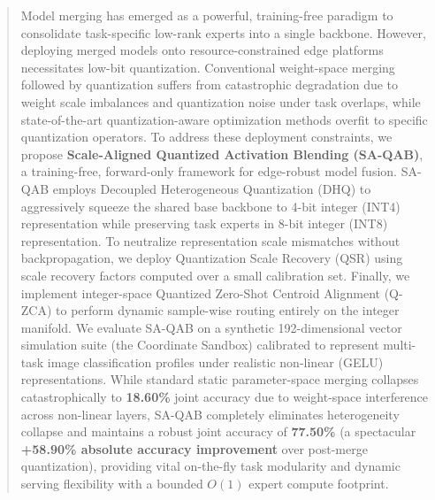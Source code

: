\begin{abstract}
Model merging has emerged as a powerful, training-free paradigm to consolidate task-specific low-rank experts into a single backbone. However, deploying merged models onto resource-constrained edge platforms necessitates low-bit quantization. Conventional weight-space merging followed by quantization suffers from catastrophic degradation due to weight scale imbalances and quantization noise under task overlaps, while state-of-the-art quantization-aware optimization methods overfit to specific quantization operators. To address these deployment constraints, we propose \textbf{Scale-Aligned Quantized Activation Blending (SA-QAB)}, a training-free, forward-only framework for edge-robust model fusion. SA-QAB employs Decoupled Heterogeneous Quantization (DHQ) to aggressively squeeze the shared base backbone to 4-bit integer (INT4) representation while preserving task experts in 8-bit integer (INT8) representation. To neutralize representation scale mismatches without backpropagation, we deploy Quantization Scale Recovery (QSR) using scale recovery factors computed over a small calibration set. Finally, we implement integer-space Quantized Zero-Shot Centroid Alignment (Q-ZCA) to perform dynamic sample-wise routing entirely on the integer manifold. We evaluate SA-QAB on a synthetic 192-dimensional vector simulation suite (the Coordinate Sandbox) calibrated to represent multi-task image classification profiles under realistic non-linear (GELU) representations. While standard static parameter-space merging collapses catastrophically to \textbf{18.60\%} joint accuracy due to weight-space interference across non-linear layers, SA-QAB completely eliminates heterogeneity collapse and maintains a robust joint accuracy of \textbf{77.50\%} (a spectacular \textbf{+58.90\% absolute accuracy improvement} over post-merge quantization), providing vital on-the-fly task modularity and dynamic serving flexibility with a bounded $O(1)$ expert compute footprint.
\end{abstract}
